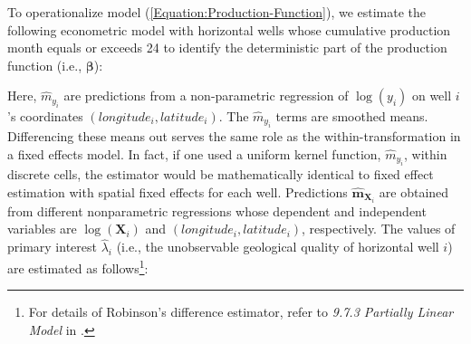 To operationalize model (\ref{Equation:Production-Function}), we estimate the following econometric model with horizontal wells whose cumulative production month equals or exceeds 24 to identify the deterministic part of the production function (i.e., $\boldsymbol{\beta}$):

Here, $\widehat{m}_{y_{i}}$ are predictions from a non-parametric regression of $\log \left( y_{i} \right)$ on well $i$'s coordinates $(longitude_{i}, latitude_{i})$. The $\widehat{m}_{y_{i}}$ terms are smoothed means. Differencing these means out serves the same role as the within-transformation in a fixed effects model. In fact, if one used a uniform kernel function, $\widehat{m}_{y_{i}}$, within discrete cells, the estimator would be mathematically identical to fixed effect estimation with spatial fixed effects for each well. Predictions $\widehat{\boldsymbol{m}}_{\boldsymbol{X}_{i}}$ are obtained from different nonparametric regressions whose dependent and independent variables are $\log \left( \boldsymbol{X}_{i} \right)$ and $(longitude_{i}, latitude_{i})$, respectively. The values of primary interest $\widehat{\lambda}_{i}$ (i.e., the unobservable geological quality of horizontal well $i$) are estimated as follows\footnote{For details of Robinson's difference estimator, refer to \textit{9.7.3 Partially Linear Model} in \cite{MicroEconometrics-Methods-and-Applications_Cameron-and-Trivedi_2005}.}:


